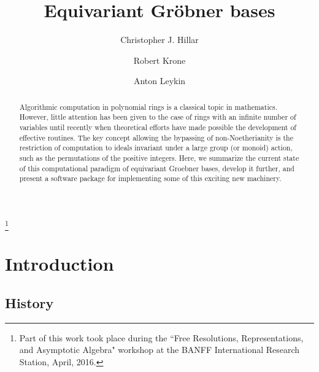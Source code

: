 \documentclass[11pt]{amsart}
\theoremstyle{definition}
\theoremstyle{remark}
\numberwithin{equation}{section}
\begin{document}
 \title{Equivariant Gr\"obner bases}

\author{Christopher J. Hillar}
\address{Redwood Center for Theoretical Neuroscience, University of California, Berkeley}

\author{Robert Krone}
\address{Georgia Tech University, Atlanta, GA}

\author{Anton Leykin}
\address{Georgia Tech University, Atlanta, GA}

\thanks{Part of this work took place during the ``Free Resolutions, Representations, and Asymptotic Algebra" workshop at the BANFF International Research Station, April, 2016.} 






\begin{abstract}
Algorithmic computation in polynomial rings is a classical topic in mathematics. However, little attention has been given to the case of rings with an infinite number of variables until recently when theoretical efforts have made possible the development of effective routines. The key concept allowing the bypassing of non-Noetherianity is the restriction of computation to ideals invariant under a large group (or monoid) action, such as the permutations of the positive integers. Here, we summarize the current state of this computational paradigm of equivariant Groebner bases, develop it further, and present a software package for implementing some of this exciting new machinery.
\end{abstract} 

\maketitle 
\tableofcontents
\section{Introduction}

\subsection{History}
\end{document}
